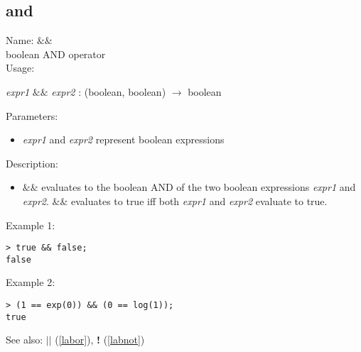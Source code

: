 \subsection{and}
\label{laband}
\noindent Name: \textbf{$\&\&$}\\
boolean AND operator\\
\noindent Usage: 
\begin{center}
\emph{expr1} \textbf{$\&\&$} \emph{expr2} : (\textsf{boolean}, \textsf{boolean}) $\rightarrow$ \textsf{boolean}
\end{center}
Parameters: 
\begin{itemize}
\item \emph{expr1} and \emph{expr2} represent boolean expressions
\end{itemize}
\noindent Description: \begin{itemize}

\item \textbf{$\&\&$} evaluates to the boolean AND of the two
   boolean expressions \emph{expr1} and \emph{expr2}. \textbf{$\&\&$} evaluates to 
   true iff both \emph{expr1} and \emph{expr2} evaluate to true.
\end{itemize}
\noindent Example 1: 
\begin{center}\begin{minipage}{15cm}\begin{Verbatim}[frame=single]
> true && false;
false
\end{Verbatim}
\end{minipage}\end{center}
\noindent Example 2: 
\begin{center}\begin{minipage}{15cm}\begin{Verbatim}[frame=single]
> (1 == exp(0)) && (0 == log(1));
true
\end{Verbatim}
\end{minipage}\end{center}
See also: \textbf{$||$} (\ref{labor}), \textbf{!} (\ref{labnot})
